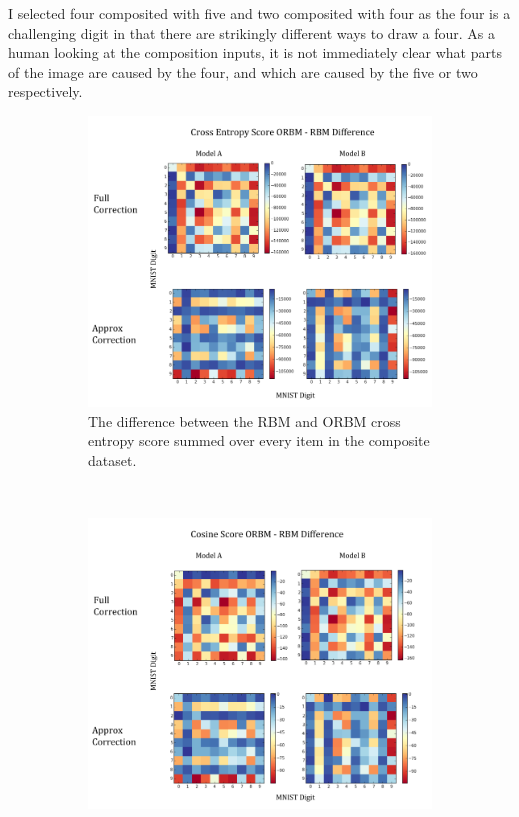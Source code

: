  I selected four composited with five and two composited with four as the four is a challenging digit in that there are strikingly different ways to draw a four. As a human looking at the composition inputs, it is not immediately clear what parts of the image are caused by the four, and which are caused by the five or two respectively.


  \begin{figure}[h]
  \centering
  \begin{subfigure}[t]{0.45\textwidth}
      \includegraphics[width=\textwidth]{Assets/Cross-Entropy-Score.png}
      \caption{The difference between the RBM and ORBM cross entropy score summed over every item in the composite dataset.}
      \label{F:Cross-Entropy-MNIST}
  \end{subfigure}
  ~ %
  \begin{subfigure}[t]{0.45\textwidth}
      \includegraphics[width=\textwidth]{Assets/Cosine-Score.png}

\end{subfigure}
\end{figure}
